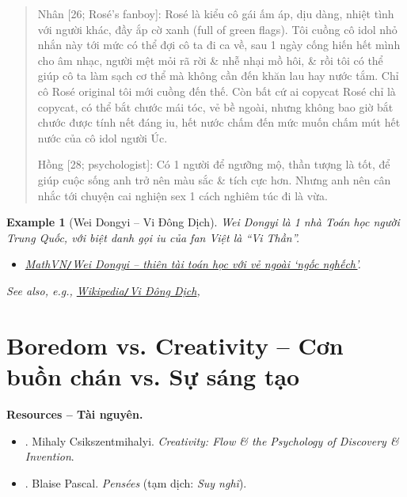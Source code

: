 \documentclass[12pt,twoside]{book}
\newtheorem{example}{Example}
\begin{document}
\begin{quote}
	{\sf Nhân [26; {\sc Rosé}'s fanboy]}: Rosé là kiểu cô gái ấm áp, dịu dàng, nhiệt tình với người khác, đầy ắp cờ xanh (full of green flags). Tôi cuồng cô idol nhỏ nhắn này tới mức có thể đợi cô ta đi ca về, sau 1 ngày cống hiến hết mình cho âm nhạc, người mệt mỏi rã rời \& nhễ nhại mồ hôi, \& rồi tôi có thể giúp cô ta làm sạch cơ thể mà không cần đến khăn lau hay nước tắm. Chỉ cô {\sc Rosé} original tôi mới cuồng đến thế. Còn bất cứ ai copycat Rosé chỉ là copycat, có thể bắt chước mái tóc, vẻ bề ngoài, nhưng không bao giờ bắt chước được tính nết đáng iu, hết nước chấm đến mức muốn chấm mút hết nước của cô idol người Úc.
	
	{\sf Hồng [28; psychologist]}: Có 1 người để ngưỡng mộ, thần tượng là tốt, để giúp cuộc sống anh trở nên màu sắc \& tích cực hơn. Nhưng anh nên cân nhắc tới chuyện cai nghiện sex 1 cách nghiêm túc đi là vừa.
\end{quote}

\begin{example}[{\sc Wei Dongyi -- Vi Đông Dịch}]
	{\sc Wei Dongyi} là 1 nhà Toán học người Trung Quốc, với biệt danh gọi iu của fan Việt là ``Vi Thần''.
	\begin{itemize}
		\item \href{https://www.mathvn.com/2021/07/wei-dongyi-thien-tai-toan-hoc-voi-ve.html}{MathVN{\tt/}{\sc Wei Dongyi} -- thiên tài toán học với vẻ ngoài `ngốc nghếch'}.
	\end{itemize}
	See also, e.g., \href{https://vi.wikipedia.org/wiki/Vi_%C4%90%C3%B4ng_D%E1%BB%8Bch}{Wikipedia{\tt/}{\sc Vi Đông Dịch}}, 
\end{example}


\section{Boredom vs. Creativity -- Cơn buồn chán  vs. Sự sáng tạo}
{\bf \textsf{Resources -- Tài nguyên.}}
\begin{itemize}
	\item \cite{Csikszentmihalyi_creativity}. {\sc Mihaly Csikszentmihalyi}. {\it Creativity: Flow \& the Psychology of Discovery \& Invention}.
	\item \cite{Pascal_pensees}. {\sc Blaise Pascal}. {\it Pens\'ees} (tạm dịch: {\it Suy nghĩ}).
\end{itemize}
\end{document}
